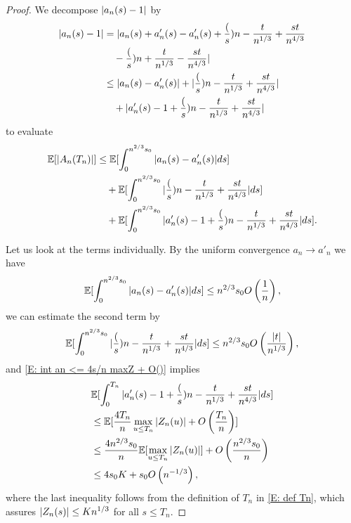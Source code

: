 \begin{proof}
    We decompose $|a_n(s) - 1|$ by
    \begin{equation}
    \begin{aligned}
    |a_n(s)-1| 
    &= | a_n(s) + a'_n(s) - a'_n(s) + \frac(s){n} - \frac{t}{n^{1 / 3}} + \frac{st}{n^{4 / 3}} \\
    &\quad	- \frac(s){n} + \frac{t}{n^{1 / 3}} - \frac{st}{n^{4 / 3}} | \\
    &\leq |a_n(s) - a'_n(s)| + 	|\frac(s){n} - \frac{t}{n^{1 / 3}} + \frac{st}{n^{4 / 3}}| \\
	&\quad    + |a'_n(s) - 1 + \frac(s){n} - \frac{t}{n^{1 / 3}} + \frac{st}{n^{4 / 3}}|
    \end{aligned}
    \end{equation}
    to evaluate
    \begin{equation}
    \begin{aligned}
    \mathbb{E}[|A_n(T_n)|] 
    &\leq \mathbb{E}[\int_{0}^{n^{2 / 3}s_0} |a_n(s) - a'_n(s)|ds] \\
    &\quad + \mathbb{E}[\int_{0}^{n^{2 / 3}s_0} |\frac(s){n} - \frac{t}{n^{1 / 3}} + \frac{st}{n^{4 / 3}}| ds] \\
    &\quad + \mathbb{E}[\int_{0}^{n^{2 / 3}s_0} |a'_n(s) - 1 + \frac(s){n} - \frac{t}{n^{1 / 3}} + \frac{st}{n^{4 / 3}}|ds].
    \end{aligned}
    \end{equation}
    
    Let us look at the terms individually. 
    By the uniform convergence $a_n \rightarrow a'_n$ we have
    \begin{equation}
    \mathbb{E}[\int_{0}^{n^{2 / 3}s_0} |a_n(s) - a'_n(s)|ds] \leq n^{2 / 3}s_0 O\left(\frac{1}{n}\right),
    \end{equation}
    we can estimate the second term by
    \begin{equation}
    \mathbb{E}[\int_{0}^{n^{2 / 3}s_0} |\frac(s){n} - \frac{t}{n^{1 / 3}} + \frac{st}{n^{4 / 3}}| ds]
    \leq n^{2 / 3}s_0 O\left(\frac{|t|}{n^{1 / 3}}\right),
    \end{equation}
    and \eqref{E: int an <= 4s/n maxZ + O()} implies
    \begin{equation}
    \begin{aligned}
    &\mathbb{E}[\int_{0}^{T_n} |a'_n(s) - 1 + \frac(s){n} - \frac{t}{n^{1 / 3}} + \frac{st}{n^{4 / 3}}|ds] \\
    &\leq \mathbb{E}[ \frac{4T_n}{n} \max_{u \leq T_n}|Z_n(u)| + O\left(\frac{T_n}{n}\right) ] \\
    &\leq \frac{4n^{2 / 3}s_0}{n} \mathbb{E}[\max_{u \leq T_n}|Z_n(u)|] + O\left(\frac{n^{2 / 3}s_0}{n}\right) \\
    &\leq 4s_0 K + s_0 O\left(n^{-1 / 3}\right),
    \end{aligned}
    \end{equation}
    where the last inequality follows from the definition of $T_n$ in \eqref{E: def Tn},
    which assures $|Z_n(s)| \leq Kn^{1 / 3}$ for all $s \leq T_n$. 
    

\end{proof}

